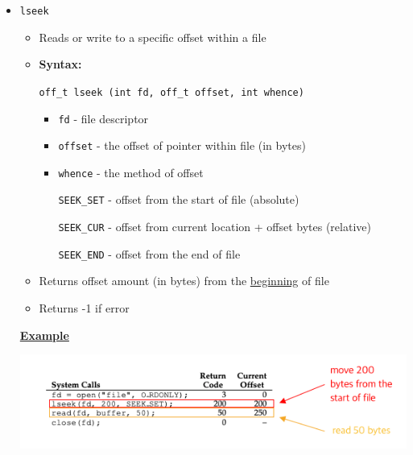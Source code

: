 \documentclass[12pt]{article}
\begin{document}
\begin{enumerate}[1.]
\begin{enumerate}[a)]
\begin{itemize}
\begin{itemize}
                \item \texttt{lseek}

                \begin{itemize}
                    \item Reads or write to a specific offset within a file
                    \item \textbf{Syntax:}

                    \bigskip

                    \texttt{off\_t lseek (int fd, off\_t offset, int whence)}

                    \bigskip

                    \begin{itemize}
                        \item \texttt{fd} - file descriptor
                        \item \texttt{offset} - the offset of pointer within file (in bytes)
                        \item \texttt{whence} - the method of offset

                        \bigskip

                        \quad \texttt{SEEK\_SET}  - offset from the start of file (absolute)

                        \quad \texttt{SEEK\_CUR} - offset from current location + offset bytes (relative)

                        \quad \texttt{SEEK\_END} - offset from the end of file
                    \end{itemize}

                    \item Returns offset amount (in bytes) from the \underline{beginning} of file
                    \item Returns -1 if error
                \end{itemize}

                \bigskip

                \underline{\textbf{Example}}

                \begin{center}
                \includegraphics[width=\linewidth]{../images/midterm_4_solution_7.png}
                \end{center}


\end{itemize}
\end{itemize}
\end{enumerate}
\end{enumerate}
\end{document}
